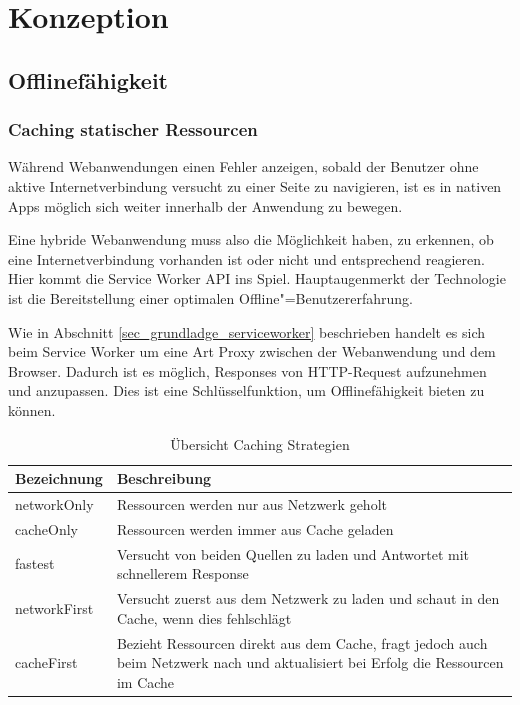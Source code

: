 \chapter{Konzeption}
\label{sec_konzeption}

\section{Offlinefähigkeit}
\label{sec_konzeption_offline}

\subsection{Caching statischer Ressourcen}
\label{subsec_konzept_caching-statische-ressourcen}

Während Webanwendungen einen Fehler anzeigen, sobald der Benutzer ohne aktive Internetverbindung versucht zu einer Seite zu navigieren, ist es in nativen Apps möglich sich weiter innerhalb der Anwendung zu bewegen. 

Eine hybride Webanwendung muss also die Möglichkeit haben, zu erkennen, ob eine Internetverbindung vorhanden ist oder nicht und entsprechend reagieren. Hier kommt die Service Worker API ins Spiel. Hauptaugenmerkt der Technologie ist die Bereitstellung einer optimalen Offline"=Benutzererfahrung.   

Wie in Abschnitt \ref{sec_grundladge_serviceworker} beschrieben handelt es sich beim Service Worker um eine Art Proxy zwischen der Webanwendung und dem Browser. Dadurch ist es möglich, Responses von HTTP-Request aufzunehmen und anzupassen. Dies ist eine Schlüsselfunktion, um Offlinefähigkeit bieten zu können.

\begin{table}[h]
\centering
\begin{tabularx}{\textwidth}{| l | X | }
    \hline
    \textbf{Bezeichnung} & \textbf{Beschreibung} \\
    \hline
    networkOnly & Ressourcen werden nur aus Netzwerk geholt \\
    \hline    
    cacheOnly & Ressourcen werden immer aus Cache geladen \\
    \hline
    fastest & Versucht von beiden Quellen zu laden und Antwortet mit schnellerem Response \\
    \hline
    networkFirst & Versucht zuerst aus dem Netzwerk zu laden und schaut in den Cache, wenn dies fehlschlägt \\
    \hline
    cacheFirst & Bezieht Ressourcen direkt aus dem Cache, fragt jedoch auch beim Netzwerk nach und aktualisiert bei Erfolg die Ressourcen im Cache \\
    \hline
\end{tabularx}
\caption{Übersicht Caching Strategien}
\label{tbl_konzeption_caching-strategien}
\end{table}

